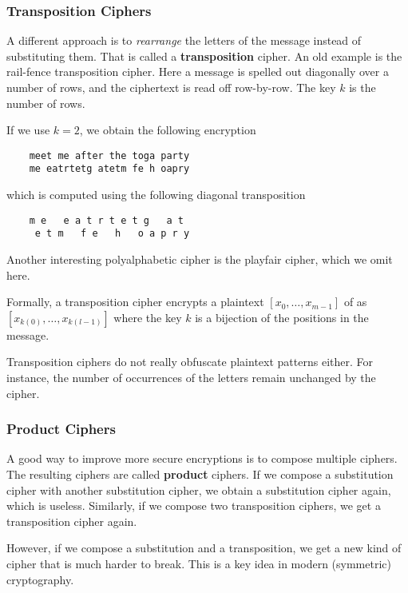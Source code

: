 \subsubsection{Transposition Ciphers}

A different approach is to \emph{rearrange} the letters of the message instead of substituting them.
That is called a \textbf{transposition} cipher.
An old example is the rail-fence transposition cipher.
Here a message is spelled out diagonally over a number of rows, and the ciphertext is read off row-by-row.
The key $k$ is the number of rows.

\begin{example}
 If we use $k=2$, we obtain the following encryption
  \begin{lstlisting}
    meet me after the toga party
    me eatrtetg atetm fe h oapry
  \end{lstlisting}
which is computed using the following diagonal transposition
  \begin{lstlisting}
    m e   e a t r t e t g   a t
     e t m   f e   h   o a p r y
  \end{lstlisting}
\end{example}
Another interesting polyalphabetic cipher is the playfair cipher, which we omit here.

Formally, a transposition cipher encrypts a plaintext $[x_0,\ldots,x_{m-1}]$ of as $[x_{k(0)},\ldots,x_{k(l-1)}]$ where the key $k$ is a bijection of the positions in the message.

Transposition ciphers do not really obfuscate plaintext patterns either.
For instance, the number of occurrences of the letters remain unchanged by the cipher.

\subsubsection{Product Ciphers}
 
A good way to improve more secure encryptions is to compose multiple ciphers.
The resulting ciphers are called \textbf{product} ciphers.
If we compose a substitution cipher with another substitution cipher, we obtain a substitution cipher again, which is useless.
Similarly, if we compose two transposition ciphers, we get a transposition cipher again.

However, if we compose a substitution and a transposition, we get a new kind of cipher that is much harder to break.
This is a key idea in modern (symmetric) cryptography. 
